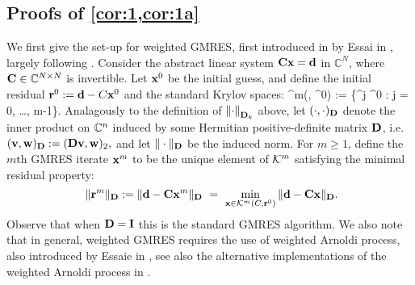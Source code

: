 %

\subsection{Proofs of \cref{cor:1,cor:1a}}\label{sec:mainproofs}

We first give the set-up for weighted GMRES, first introduced in by Essai in \cite{Es:98}, largely following \cite[Section 5]{GrSpVa:17}. Consider the abstract  linear system 
$\mathbf{C} \mathbf{x} = \mathbf{d}$
in $\mathbb{C}^N$, where $\mathbf{C} \in \mathbb C^{N\times N}$ is invertible. Let $\mathbf{x}^{0}$ be the initial guess, and define the initial residual $\mathbf{r}^0 := \mathbf{d}- C \mathbf{x}^0$ and the standard Krylov spaces:  
\beqs  
\cK^m(\Cmat, \br^0) := \big\{\matrixC^j \br^0 : j = 0, \ldots, m-1\big\}.
\eeqs
Analagously to the definition of $\NDk{\cdot}$ above, let $(\cdot , \cdot )_{\mathbf{D}}$ denote the inner product on $\mathbb C^n$ 
induced by some Hermitian positive-definite matrix $\mathbf{D}$, i.e.~
$(\mathbf{v},\mathbf{w})_{\mathbf{D}} := (\mathbf{D} \mathbf{v}, \mathbf{w})_2,$
and let $\Vert \cdot \Vert_{\mathbf{D}}$ be the induced norm. For $m \geq 1$, define the $m$th GMRES iterate $\mathbf{x}^m$  to be  the unique element of $\mathcal K^m$ satisfying  the  
 minimal residual  property: 
$$ \ \Vert \mathbf{r}^m \Vert_{\mathbf{D}} := \Vert \mathbf{d} - \mathbf{C} \mathbf{x}^m \Vert_{\mathbf{D}} \ = \ \min_{\mathbf{x} \in \mathcal K^m(C, \mathbf{r}^0)} \Vert {\mathbf{d}} - {\mathbf{C}} {\mathbf{x}} \Vert_{\mathbf{D}}. $$
Observe that when $\mathbf{D} = \mathbf{I}$ this is the standard GMRES algorithm. We also note that in general, weighted GMRES requires the use of weighted Arnoldi process, also introduced by Essaie in \cite{Es:98}, see also the alternative implementations of the weighted Arnoldi process in \cite{GuPe:14}.


